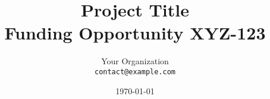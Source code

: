 \usepackage[utf8]{inputenc}
\usepackage[T1]{fontenc}
\usepackage{lmodern}
\usepackage{microtype}

\usepackage{geometry}
\geometry{margin=1in}

\usepackage{graphicx}
\usepackage{float}
\usepackage{subcaption}
\usepackage{booktabs}
\usepackage{array}
\usepackage{longtable}

\usepackage{amsmath, amssymb}
\usepackage{siunitx}

\usepackage{hyperref}

\usepackage[backend=biber,style=ieee]{biblatex}


\title{Project Title \\ \large Funding Opportunity XYZ-123}
\author{Your Organization \\ \texttt{contact@example.com}}
\date{\today}
